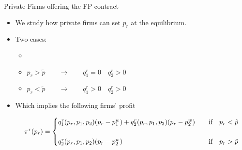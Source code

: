 \documentclass{class}
\begin{document}
\begin{frame}{Private Firms offering the FP contract}\label{PrivateFirms1}

\begin{itemize}
    \item We study how private firms can set $p_r$ at the equilibrium.

    \vfill

    \item Two cases:  \vfill
    \begin{itemize}
        \item \hyperlink{qtt_elec1}{} \vfill
        \item $p_r > \tilde{p} \quad \quad \rightarrow \quad \quad q^r_1 = 0 \quad q^r_2 > 0$ \vfill
        \item $p_r < \tilde{p} \quad \quad \rightarrow \quad \quad q^r_1 > 0 \quad q^r_2 > 0$ 
    \end{itemize}


\vfill

\item Which implies the following firms' profit

\begin{equation*}
 \pi^r(p_r) = \begin{cases}
 q^{r}_1(p_r,p_1,p_2) (p_r - p_1^w) + q^{r}_2(p_r,p_1,p_2) (p_r - p_2^w) &\quad \text{if} \quad p_r < \Tilde{p} \\\\
 q^{r}_2(p_r,p_1,p_2) (p_r - p_2^w) & \quad \text{if} \quad p_r > \Tilde{p}
 \end{cases}
\end{equation*}
    \end{itemize}
\end{frame}

\end{document}

